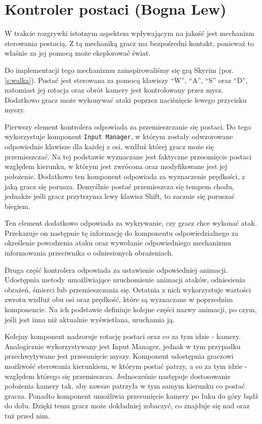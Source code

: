 \section{Kontroler postaci (Bogna Lew)}\label{s:por_impl}
W trakcie rozgrywki istotnym aspektem wpływającym na jakość jest mechanizm sterowania postacią. Z tą mechaniką gracz ma
bezpośredni kontakt, ponieważ to właśnie za jej pomocą może eksplorować świat.

Do implementacji tego mechanizmu zainspirowaliśmy się grą Skyrim (por. \ref{s:walka}). Postać jest sterowana za pomocą klawiszy “W”, “A”, “S”
oraz “D”, natomiast jej rotacja oraz obrót kamery jest kontrolowany przez mysz. Dodatkowo gracz może wykonywać ataki
poprzez naciśnięcie lewego przycisku myszy.

Pierwszy element kontrolera odpowiada za przemieszczanie się postaci. Do tego wykorzystuje komponent \texttt{Input Manager}, w
którym zostały odwzorowane odpowiednie klawisze dla każdej z osi, wzdłuż której gracz może się przemieszczać. Na tej
podstawie wyznaczane jest faktyczne przesunięcie postaci względem kierunku, w którym jest zwrócona oraz modyfikowane
jest jej położenie. Dodatkowo ten komponent odpowiada za wyznaczenie prędkości, z jaką gracz się porusza. Domyślnie
postać przemieszcza się tempem chodu, jednakże jeśli gracz przytrzyma lewy klawisz Shift, to zacznie się poruszać biegiem.

Ten element dodatkowo odpowiada za wykrywanie, czy gracz chce wykonać atak. Przekazuje on następnie tę informację do
komponentu odpowiedzialnego za określenie powodzenia ataku oraz wywołanie odpowiedniego mechanizmu informowania
przeciwnika o odniesionych obrażeniach.

Druga część kontrolera odpowiada za ustawienie odpowiedniej animacji. Udostępnia metody umożliwiające uruchomienie
animacji ataków, odniesienia obrażeń, śmierci lub przemieszczania się. Ostatnia z nich wykorzystuje wartości zwrotu wzdłuż
obu osi oraz prędkość, które są wyznaczane w poprzednim komponencie. Na ich podstawie definiuje kolejne części nazwy
animacji, po czym, jeśli jest inna niż aktualnie wyświetlana, uruchamia ją.

Kolejny komponent nadzoruje rotację postaci oraz co za tym idzie - kamery. Analogicznie wykorzystywany jest Input
Manager, jednak w tym przypadku przechwytywane jest przesunięcie myszy. Komponent udostępnia graczowi możliwość
sterowania kierunkiem, w którym postać patrzy, a co za tym idzie - względem którego się przemieszcza. Jednocześnie
następuje dostosowanie położenia kamery tak, aby zawsze patrzyła w tym samym kierunku co postać gracza. Ponadto
komponent umożliwia przesunięcie kamery po łuku do góry bądź do dołu. Dzięki temu gracz może dokładniej zobaczyć,
co znajduje się nad oraz tuż przed nim.

